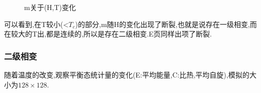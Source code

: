 \documentclass[12pt]{article} %
\begin{document}
\begin{figure}[hbt]
    \caption{m关于(H,T)变化}
    \setcounter{subfigure}{0}
    \begin{center}
    \end{center}
\end{figure}
可以看到,在T较小(<$T_c$)的部分,m随H的变化出现了断裂,也就是说存在一级相变,而在较大的T出,都是连续的,所以是存在二级相变.E页同样出项了断裂.


\subsubsection{二级相变}
随着温度的改变,观察平衡态统计量的变化(E:平均能量,C:比热,平均自旋),模拟的大小为$128\times128$.
\end{document}
